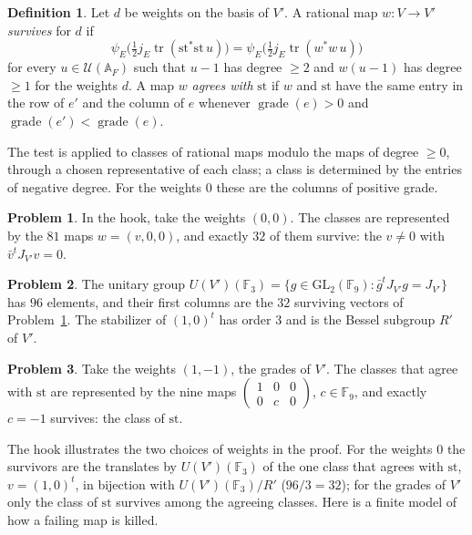 \documentclass[reqno]{amsart}
\theoremstyle{definition}
\newtheorem{problem}{Problem}[section]
\newtheorem{definition}{Definition}[section]
\theoremstyle{plain}
\theoremstyle{remark}
\newcommand{\F}{\mathbb{F}}
\newcommand{\A}{\mathbb{A}}
\newcommand{\Uc}{\mathcal{U}}
\newcommand{\st}{\mathrm{st}}
\newcommand{\tr}{\operatorname{tr}}
\begin{document}
\begin{definition}\label{def:survive}
Let \(d\) be weights on the basis of \(V'\).  A rational map \(w\colon V\to V'\) \emph{survives} for \(d\) if
\[
  \psi_E\bigl(\tfrac12j_E\tr(\st^*\st\,u)\bigr)=\psi_E\bigl(\tfrac12j_E\tr(w^*w\,u)\bigr)
\]
for every \(u\in\Uc(\A_F)\) such that \(u-1\) has degree \(\ge2\) and \(w(u-1)\) has degree \(\ge1\) for the weights \(d\).  A map \(w\) \emph{agrees with} \(\st\) if \(w\) and \(\st\) have the same entry in the row of \(e'\) and the column of \(e\) whenever \(\operatorname{grade}(e)>0\) and \(\operatorname{grade}(e')<\operatorname{grade}(e)\).
\end{definition}

The test is applied to classes of rational maps modulo the maps of degree \(\ge0\), through a chosen representative of each class; a class is determined by the entries of negative degree.  For the weights \(0\) these are the columns of positive grade.

\begin{problem}\label{pr:hook-survivors}
In the hook, take the weights \((0,0)\).  The classes are represented by the \(81\) maps \(w=(v,0,0)\), and exactly \(32\) of them survive: the \(v\ne0\) with \(\bar v^{t}J_{V'}v=0\).
\end{problem}

\begin{problem}\label{pr:hook-orbit}
The unitary group \(U(V')(\F_3)=\{g\in\mathrm{GL}_2(\F_9):\bar g^{t}J_{V'}g=J_{V'}\}\) has \(96\) elements, and their first columns are the \(32\) surviving vectors of Problem~\ref{pr:hook-survivors}.  The stabilizer of \((1,0)^{t}\) has order \(3\) and is the Bessel subgroup \(R'\) of \(V'\).
\end{problem}

\begin{problem}\label{pr:hook-second}
Take the weights \((1,-1)\), the grades of \(V'\).  The classes that agree with \(\st\) are represented by the nine maps \(\left(\begin{smallmatrix}1&0&0\\0&c&0\end{smallmatrix}\right)\), \(c\in\F_9\), and exactly \(c=-1\) survives: the class of \(\st\).
\end{problem}

The hook illustrates the two choices of weights in the proof.  For the weights \(0\) the survivors are the translates by \(U(V')(\F_3)\) of the one class that agrees with \(\st\), \(v=(1,0)^{t}\), in bijection with \(U(V')(\F_3)/R'\) (\(96/3=32\)); for the grades of \(V'\) only the class of \(\st\) survives among the agreeing classes.  Here is a finite model of how a failing map is killed.
\end{document}

